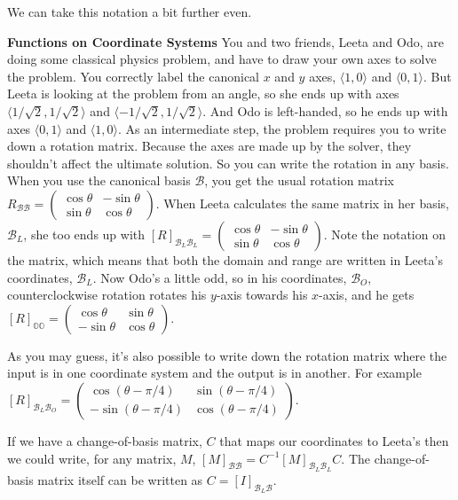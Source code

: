 \documentclass{amsbook}
\begin{document}
We can take this notation a bit further even.

\begin{tcolorbox}[title=Example: Coordinate Systems,colback=blue!5]
{\bfseries\Large Functions on Coordinate Systems}
You and two friends, Leeta and Odo, are doing some classical physics problem, and have to draw your own axes to solve the problem.  You correctly label the canonical $x$ and $y$ axes, $\langle 1,0\rangle$ and $\langle 0,1\rangle$.  But Leeta is looking at the problem from an angle, so she ends up with axes $\langle 1/\sqrt2, 1/\sqrt2\rangle$ and $\langle -1/\sqrt2, 1/\sqrt2\rangle$.  And Odo is left-handed, so he ends up with axes $\langle 0,1\rangle$ and $\langle 1,0\rangle$.  As an intermediate step, the problem requires you to write down a rotation matrix.  Because the axes are made up by the solver, they shouldn't affect the ultimate solution.  So you can write the rotation in any basis.  When you use the canonical basis $\mathcal B$, you get the usual rotation matrix $R_{\mathcal B\mathcal B}=\left(\begin{array}{cc}\cos\theta & -\sin\theta \\ \sin\theta & \cos\theta\end{array}\right)$.  When Leeta calculates the same matrix in her basis, $\mathcal B_L$, she too ends up with $[R]_{\mathcal B_L\mathcal B_L}=\left(\begin{array}{cc}\cos\theta & -\sin\theta \\ \sin\theta & \cos\theta\end{array}\right)$.  Note the notation on the matrix, which means that both the domain and range are written in Leeta's coordinates, $\mathcal B_L$.  Now Odo's a little odd, so in his coordinates, $\mathcal B_O$, counterclockwise rotation rotates his $y$-axis towards his $x$-axis, and he gets $[R]_{\mathbb O\mathbb O}=\left(\begin{array}{cc}\cos\theta & \sin\theta \\ -\sin\theta & \cos\theta\end{array}\right)$.

As you may guess, it's also possible to write down the rotation matrix where the input is in one coordinate system and the output is in another.  For example $[R]_{\mathcal B_L\mathcal B_O}=\left(\begin{array}{cc} \cos\left(\theta-\pi/4\right) & \sin\left(\theta-\pi/4\right) \\ -\sin\left(\theta-\pi/4\right) & \cos\left(\theta-\pi/4\right)\end{array}\right)$.

If we have a change-of-basis matrix, $C$ that maps our coordinates to Leeta's then we could write, for any matrix, $M$, $[M]_{\mathcal B\mathcal B}=C^{-1}[M]_{\mathcal B_L\mathcal B_L}C$.  The change-of-basis matrix itself can be written as $C=[I]_{\mathcal B_L\mathcal B}$.
\end{tcolorbox}
\end{document}
